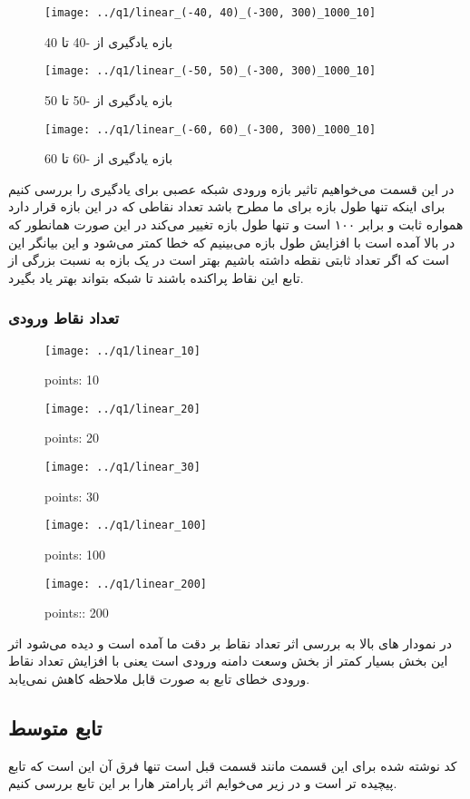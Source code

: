 \documentclass[a4paper,12pt]{article}
\begin{document}
\begin{figure}[!htb]
  \texttt{[image: ../q1/linear\_(-40, 40)\_(-300, 300)\_1000\_10]}
  \caption{بازه یادگیری از -40 تا 40}
\endminipage\hfill
{}
  \texttt{[image: ../q1/linear\_(-50, 50)\_(-300, 300)\_1000\_10]}
  \caption{بازه یادگیری از -50 تا 50}
\endminipage\hfill
{}
  \texttt{[image: ../q1/linear\_(-60, 60)\_(-300, 300)\_1000\_10]}
  \caption{بازه یادگیری از -60 تا 60}
\endminipage
\end{figure}
در این قسمت می‌خواهیم تاثیر بازه ورودی شبکه عصبی برای یادگیری را بررسی کنیم برای اینکه تنها طول بازه برای ما مطرح باشد تعداد نقاطی که در این بازه قرار دارد همواره ثابت و برابر ۱۰۰ است و تنها طول بازه تغییر می‌کند در این صورت همانطور که در بالا آمده است با افزایش طول بازه می‌بینیم که خطا کمتر می‌شود و این بیانگر این است که اگر تعداد ثابتی نقطه داشته باشیم بهتر است در یک بازه به نسبت بزرگی از تابع این نقاط پراکنده باشند تا شبکه بتواند بهتر یاد بگیرد.




\newpage
\subsubsection{تعداد نقاط ورودی}



\begin{figure}[!htb]
  \texttt{[image: ../q1/linear\_10]}
  \caption{points: 10}
\endminipage\hfill
{}
  \texttt{[image: ../q1/linear\_20]}
  \caption{points: 20}
\endminipage\hfill
{}
  \texttt{[image: ../q1/linear\_30]}
  \caption{points: 30}
\endminipage
\end{figure}

\begin{figure}[!htb]
  \texttt{[image: ../q1/linear\_100]}
  \caption{points: 100}
\endminipage\hfill
{}
  \texttt{[image: ../q1/linear\_200]}
  \caption{points:: 200}
\endminipage\hfill
\end{figure}
در نمودار های بالا به بررسی اثر تعداد نقاط بر دقت ما آمده است و دیده می‌شود اثر این بخش بسیار کمتر از بخش وسعت دامنه ورودی است یعنی با افزایش تعداد نقاط ورودی خطای تابع به صورت قابل ملاحظه کاهش نمی‌یابد.

\newpage
\subsection{تابع متوسط}
کد نوشته شده برای این قسمت مانند قسمت قبل است تنها فرق آن این است که تابع پیچیده تر است و در زیر می‌خوایم اثر پارامتر هارا بر این تابع بررسی کنیم.
\end{document}
